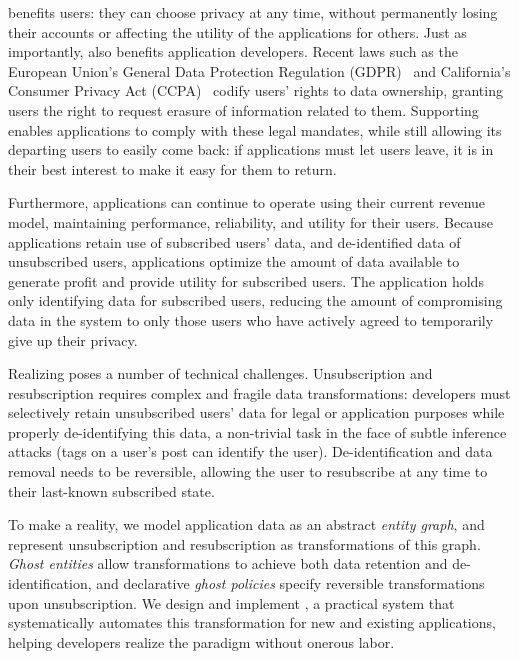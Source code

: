 \name benefits users: they can choose privacy at any time, without
permanently losing their accounts or affecting the utility of the applications for others.  Just as
importantly, \name also benefits application developers. Recent laws such as the
European Union's General Data Protection Regulation (GDPR)~\cite{eu:gdpr} and California's Consumer
Privacy Act (CCPA)~\cite{ca:privacy-act} codify users' rights to data ownership, granting users the
right to request erasure of information related to them. Supporting \name enables
applications to comply with these legal mandates, while still allowing its departing users to easily
come back: if applications must let users leave, it is in their best interest to make it easy for
them to return.  

Furthermore, applications can continue to operate using their current revenue model, maintaining
performance, reliability, and utility for their users.  Because applications retain use of
subscribed users' data, and de-identified data of unsubscribed users, applications optimize the
amount of data available to generate profit and provide utility for subscribed users. The
application holds only identifying data for subscribed users, reducing the amount of
compromising data in the system to only those users who have actively agreed to temporarily give up
their privacy.

Realizing \name poses a number of technical challenges.
Unsubscription and resubscription requires complex and fragile data transformations: developers must
selectively retain unsubscribed users' data for legal or application purposes while properly
de-identifying this data, a non-trivial task in the face of subtle inference attacks (\eg tags on a
user's post can identify the user). De-identification and data removal needs to be reversible,
allowing the user to resubscribe at any time to their last-known subscribed state.

To make \name a reality, we model application data as an abstract \emph{entity graph}, and
represent unsubscription and resubscription as transformations of this graph.
\emph{Ghost entities} allow transformations to achieve both data retention and de-identification,
and declarative \emph{ghost policies} specify reversible transformations upon unsubscription.
We design and implement \sys, a practical system that systematically automates this transformation for new and existing applications, helping developers realize the \name paradigm without onerous labor.
\fi
